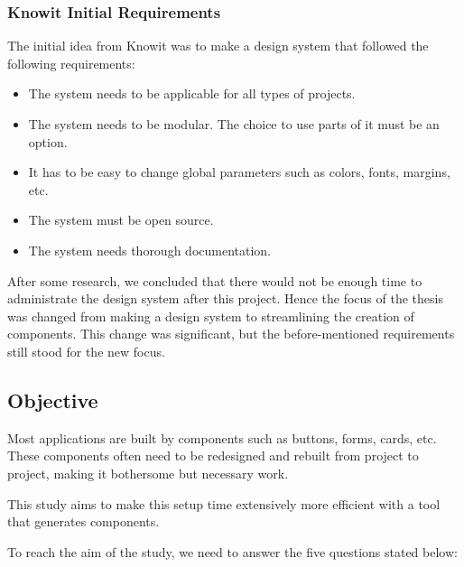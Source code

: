 \subsubsection{Knowit Initial Requirements}%
\label{ssub:Knowit Initial Requirements}
The initial idea from Knowit was to make a design system\cite{fanguyComprehensiveGuideDesign} that followed the following requirements:
\begin{itemize}
  \item The system needs to be applicable for all types of projects.
  \item The system needs to be modular. The choice to use parts of it must be an option.
  \item It has to be easy to change global parameters such as colors, fonts, margins, etc.
  \item The system must be open source.
  \item The system needs thorough documentation.
\end{itemize}

After some research, we concluded that there would not be enough time to administrate the design system after this project. Hence the focus of the thesis was changed from making a design system to streamlining the creation of \glspl{component}. This change was significant, but the before-mentioned requirements still stood for the new focus. 




\subsection{Objective}
\label{sub:Objective}
Most applications are built by \glspl{component} such as buttons, forms, cards\cite{babichSimpleDesignTips2020}, etc. These \glspl{component} often need to be redesigned and rebuilt from project to project, making it bothersome but necessary work. 

This study aims to make this setup time extensively more efficient with a tool that generates \glspl{component}. 

To reach the aim of the study, we need to answer the five questions stated below:  

